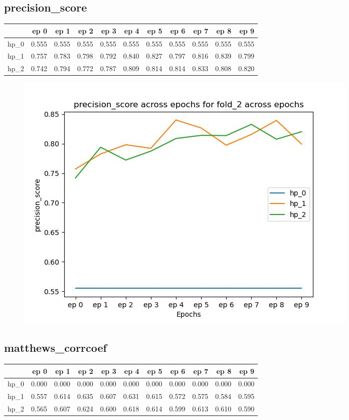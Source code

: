 \documentclass{article}
\begin{document}
\subsection{precision\_score}
\begin{tabular}{lrrrrrrrrrr}
\toprule
{} &   ep 0 &   ep 1 &   ep 2 &   ep 3 &   ep 4 &   ep 5 &   ep 6 &   ep 7 &   ep 8 &   ep 9 \\
\midrule
hp\_0 &  0.555 &  0.555 &  0.555 &  0.555 &  0.555 &  0.555 &  0.555 &  0.555 &  0.555 &  0.555 \\
hp\_1 &  0.757 &  0.783 &  0.798 &  0.792 &  0.840 &  0.827 &  0.797 &  0.816 &  0.839 &  0.799 \\
hp\_2 &  0.742 &  0.794 &  0.772 &  0.787 &  0.809 &  0.814 &  0.814 &  0.833 &  0.808 &  0.820 \\
\bottomrule
\end{tabular}

\begin{figure}[H]
\includegraphics[scale = 0.75]{fold_2/precision_score}
\end{figure}
\subsection{matthews\_corrcoef}
\begin{tabular}{lrrrrrrrrrr}
\toprule
{} &   ep 0 &   ep 1 &   ep 2 &   ep 3 &   ep 4 &   ep 5 &   ep 6 &   ep 7 &   ep 8 &   ep 9 \\
\midrule
hp\_0 &  0.000 &  0.000 &  0.000 &  0.000 &  0.000 &  0.000 &  0.000 &  0.000 &  0.000 &  0.000 \\
hp\_1 &  0.557 &  0.614 &  0.635 &  0.607 &  0.631 &  0.615 &  0.572 &  0.575 &  0.584 &  0.595 \\
hp\_2 &  0.565 &  0.607 &  0.624 &  0.600 &  0.618 &  0.614 &  0.599 &  0.613 &  0.610 &  0.590 \\
\bottomrule
\end{tabular}
\end{document}
